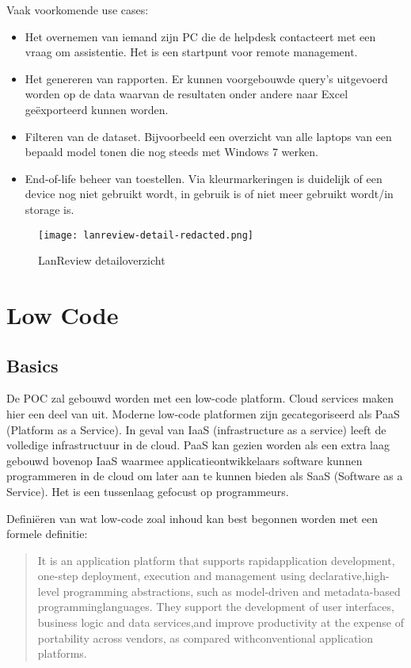 Vaak voorkomende use cases:
\begin{itemize}
    \item Het overnemen van iemand zijn PC die de helpdesk contacteert met een vraag om assistentie. Het is een startpunt voor remote management.
    \item Het genereren van rapporten. Er kunnen voorgebouwde query's uitgevoerd worden op de data waarvan de resultaten onder andere naar Excel geëxporteerd kunnen worden.
    \item Filteren van de dataset. Bijvoorbeeld een overzicht van alle laptops van een bepaald model tonen die nog steeds met Windows 7 werken.
    \item End-of-life beheer van toestellen. Via kleurmarkeringen is duidelijk of een device nog niet gebruikt wordt, in gebruik is of niet meer gebruikt wordt/in storage is.
\end{itemize}


\begin{figure}[h!]
    \texttt{[image: lanreview-detail-redacted.png]}
    \caption{LanReview detailoverzicht}
    \label{fig:lr-detail}
\end{figure}

\section{Low Code}

\subsection{Basics}

De POC zal gebouwd worden met een low-code platform. Cloud services maken hier een deel van uit. Moderne low-code platformen zijn gecategoriseerd als PaaS (Platform as a Service). In geval van IaaS (infrastructure as a service) leeft de volledige infrastructuur in de cloud. PaaS kan gezien worden als een extra laag gebouwd bovenop IaaS waarmee applicatieontwikkelaars software kunnen programmeren in de cloud om later aan te kunnen bieden als SaaS (Software as a Service). Het is een tussenlaag gefocust op programmeurs. \autocite{Nucleus2017}

Definiëren van wat low-code zoal inhoud kan best begonnen worden met een formele definitie:
\begin{quote}
    It is an application platform that supports rapidapplication development, one-step deployment, execution and management using declarative,high-level programming abstractions, such as model-driven and metadata-based programminglanguages. They support the development of user interfaces, business logic and data services,and improve productivity at the expense of portability across vendors, as compared withconventional application platforms.\\ \autocite{Vincent2019}
\end{quote}


